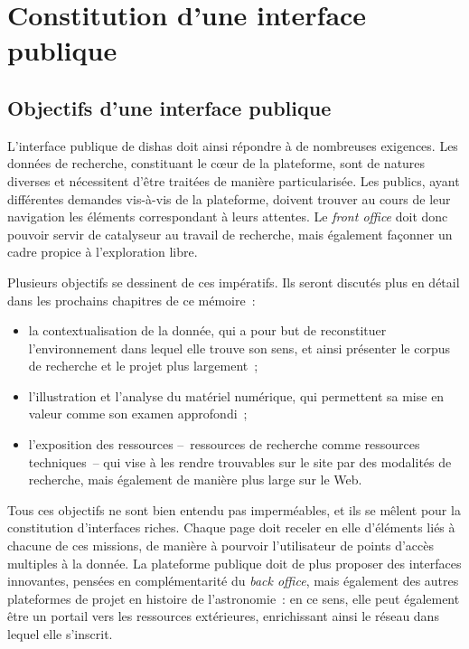 \documentclass[a4paper,12pt,twoside]{book}
\newcommand{\eng}{\emph}
\newcommand{\dishas}{\gls{dishas}\xspace}
\begin{document}
	\section{Constitution d'une interface publique}
		\subsection{Objectifs d'une interface publique}
L'interface publique de \dishas doit ainsi répondre à de nombreuses exigences. Les données de recherche, constituant le cœur de la plateforme, sont de natures diverses et nécessitent d'être traitées de manière particularisée. Les publics, ayant différentes demandes vis-à-vis de la plateforme, doivent trouver au cours de leur navigation les éléments correspondant à leurs attentes. Le \eng{front office} doit donc pouvoir servir de catalyseur au travail de recherche, mais également façonner un cadre propice à l'exploration libre.

Plusieurs objectifs se dessinent de ces impératifs. Ils seront discutés plus en détail dans les prochains chapitres de ce mémoire~:
\begin{itemize}
\item la contextualisation de la donnée, qui a pour but de reconstituer l'environnement dans lequel elle trouve son sens, et ainsi présenter le corpus de recherche et le projet plus largement~;
\item l'illustration et l'analyse du matériel numérique, qui permettent sa mise en valeur comme son examen approfondi~;
\item l'exposition des ressources –~ressources de recherche comme ressources techniques~– qui vise à les rendre trouvables sur le site par des modalités de recherche, mais également de manière plus large sur le Web.
\end{itemize}

Tous ces objectifs ne sont bien entendu pas imperméables, et ils se mêlent pour la constitution d'interfaces riches. Chaque page doit receler en elle d'éléments liés à chacune de ces missions, de manière à pourvoir l'utilisateur de points d'accès multiples à la donnée. La plateforme publique doit de plus proposer des interfaces innovantes, pensées en complémentarité du \eng{back office}, mais également des autres plateformes de projet en histoire de l'astronomie~: en ce sens, elle peut également être un portail vers les ressources extérieures, enrichissant ainsi le réseau dans lequel elle s'inscrit.
\end{document}
